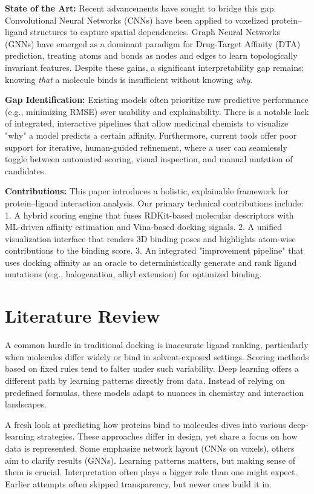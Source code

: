 \documentclass[conference]{IEEEtran}
\begin{document}
\noindent
\textbf{State of the Art:}
Recent advancements have sought to bridge this gap. Convolutional Neural Networks (CNNs) have been applied to voxelized protein--ligand structures to capture spatial dependencies. Graph Neural Networks (GNNs) have emerged as a dominant paradigm for Drug-Target Affinity (DTA) prediction, treating atoms and bonds as nodes and edges to learn topologically invariant features. Despite these gains, a significant interpretability gap remains; knowing \textit{that} a molecule binds is insufficient without knowing \textit{why}.

\noindent
\textbf{Gap Identification:}
Existing models often prioritize raw predictive performance (e.g., minimizing RMSE) over usability and explainability. There is a notable lack of integrated, interactive pipelines that allow medicinal chemists to visualize "why" a model predicts a certain affinity. Furthermore, current tools offer poor support for iterative, human-guided refinement, where a user can seamlessly toggle between automated scoring, visual inspection, and manual mutation of candidates.

\noindent
\textbf{Contributions:}
This paper introduces a holistic, explainable framework for protein--ligand interaction analysis. Our primary technical contributions include:
1.  A hybrid scoring engine that fuses RDKit-based molecular descriptors with ML-driven affinity estimation and Vina-based docking signals.
2.  A unified visualization interface that renders 3D binding poses and highlights atom-wise contributions to the binding score.
3.  An integrated "improvement pipeline" that uses docking affinity as an oracle to deterministically generate and rank ligand mutations (e.g., halogenation, alkyl extension) for optimized binding.



\section{Literature Review}

A common hurdle in traditional docking is inaccurate ligand ranking, particularly when molecules differ widely or bind in solvent-exposed settings. Scoring methods based on fixed rules tend to falter under such variability. Deep learning offers a different path by learning patterns directly from data. Instead of relying on predefined formulas, these models adapt to nuances in chemistry and interaction landscapes.

A fresh look at predicting how proteins bind to molecules dives into various deep-learning strategies. These approaches differ in design, yet share a focus on how data is represented. Some emphasize network layout (CNNs on voxels), others aim to clarify results (GNNs). Learning patterns matters, but making sense of them is crucial. Interpretation often plays a bigger role than one might expect. Earlier attempts often skipped transparency, but newer ones build it in.
\end{document}
